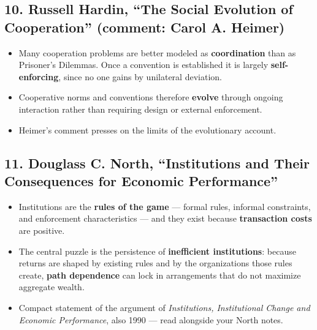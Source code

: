 \documentclass[12pt]{article}
\begin{document}
\subsection*{10. Russell Hardin, ``The Social Evolution of Cooperation'' (comment: Carol A. Heimer)}
\begin{itemize}[leftmargin=*, itemsep=3pt]
    \item Many cooperation problems are better modeled as \textbf{coordination}
    than as Prisoner's Dilemmas. Once a convention is established it is
    largely \textbf{self-enforcing}, since no one gains by unilateral
    deviation.
    \item Cooperative norms and conventions therefore \textbf{evolve} through
    ongoing interaction rather than requiring design or external enforcement.
    \item Heimer's comment presses on the limits of the evolutionary account.
\end{itemize}

\subsection*{11. Douglass C. North, ``Institutions and Their Consequences for Economic Performance''}
\begin{itemize}[leftmargin=*, itemsep=3pt]
    \item Institutions are the \textbf{rules of the game} --- formal rules,
    informal constraints, and enforcement characteristics --- and they exist
    because \textbf{transaction costs} are positive.
    \item The central puzzle is the persistence of \textbf{inefficient
    institutions}: because returns are shaped by existing rules and by the
    organizations those rules create, \textbf{path dependence} can lock in
    arrangements that do not maximize aggregate wealth.
    \item Compact statement of the argument of \textit{Institutions,
    Institutional Change and Economic Performance}, also 1990 --- read
    alongside your North notes.
\end{itemize}
\end{document}
